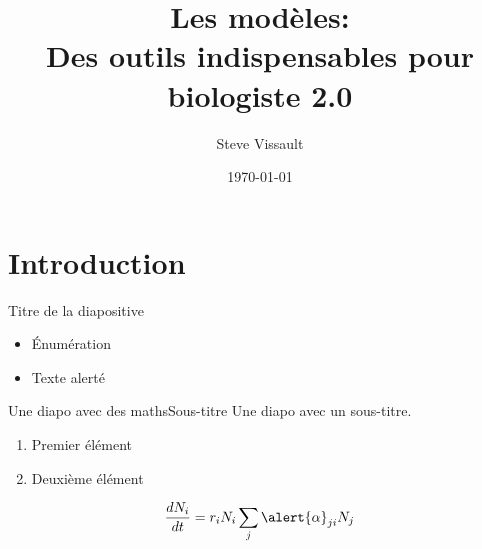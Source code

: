 \documentclass{eecslides}
\title[Modélisation]{\textbf{Les modèles:\\}Des outils indispensables pour biologiste 2.0}
\author[Steve Vissault]{Steve Vissault}
\institute[Chaire de recherche EEC]{UQAR -- Chaire de Recherche EEC}
\date{\today}
\begin{document}
	\begin{frame}[plain]
		\titlepage
	\end{frame}

	\begin{frame}[plain]
		\tableofcontents
	\end{frame}

	\section{Introduction}

	\begin{frame}{Titre de la diapositive}
	    
		\begin{itemize}
			\item Énumération
			\item Texte \alert{alerté} 
		\end{itemize}
	
	\end{frame}

	\begin{frame}{Une diapo avec des maths}{Sous-titre}
		Une diapo avec un sous-titre.

		\begin{enumerate}
			\item Premier élément
			\item Deuxième élément
		\end{enumerate}

		$$\frac{dN_i}{dt} = r_iN_i\sum_j\alert{\alpha}_{ji}N_j$$

	\end{frame}
\end{document}
